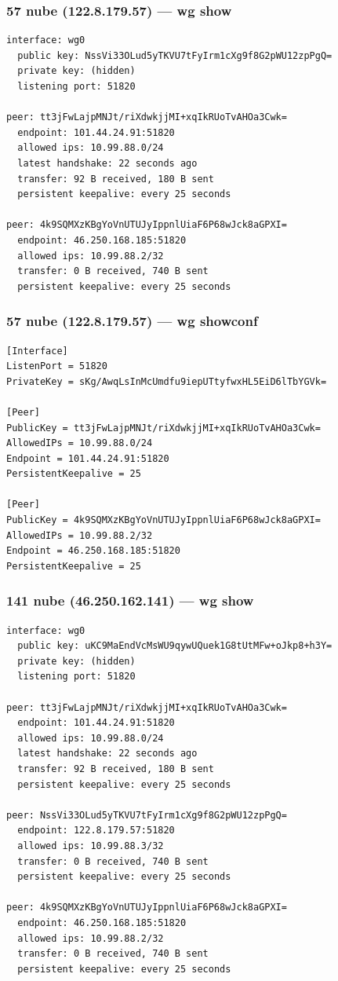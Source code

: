 \documentclass[11pt,a4paper]{article}
\begin{document}
\subsubsection*{57 nube (122.8.179.57) — wg show}
\begin{lstlisting}
interface: wg0
  public key: NssVi33OLud5yTKVU7tFyIrm1cXg9f8G2pWU12zpPgQ=
  private key: (hidden)
  listening port: 51820

peer: tt3jFwLajpMNJt/riXdwkjjMI+xqIkRUoTvAHOa3Cwk=
  endpoint: 101.44.24.91:51820
  allowed ips: 10.99.88.0/24
  latest handshake: 22 seconds ago
  transfer: 92 B received, 180 B sent
  persistent keepalive: every 25 seconds

peer: 4k9SQMXzKBgYoVnUTUJyIppnlUiaF6P68wJck8aGPXI=
  endpoint: 46.250.168.185:51820
  allowed ips: 10.99.88.2/32
  transfer: 0 B received, 740 B sent
  persistent keepalive: every 25 seconds

\end{lstlisting}

\subsubsection*{57 nube (122.8.179.57) — wg showconf}
\begin{lstlisting}
[Interface]
ListenPort = 51820
PrivateKey = sKg/AwqLsInMcUmdfu9iepUTtyfwxHL5EiD6lTbYGVk=

[Peer]
PublicKey = tt3jFwLajpMNJt/riXdwkjjMI+xqIkRUoTvAHOa3Cwk=
AllowedIPs = 10.99.88.0/24
Endpoint = 101.44.24.91:51820
PersistentKeepalive = 25

[Peer]
PublicKey = 4k9SQMXzKBgYoVnUTUJyIppnlUiaF6P68wJck8aGPXI=
AllowedIPs = 10.99.88.2/32
Endpoint = 46.250.168.185:51820
PersistentKeepalive = 25

\end{lstlisting}

\subsubsection*{141 nube (46.250.162.141) — wg show}
\begin{lstlisting}
interface: wg0
  public key: uKC9MaEndVcMsWU9qywUQuek1G8tUtMFw+oJkp8+h3Y=
  private key: (hidden)
  listening port: 51820

peer: tt3jFwLajpMNJt/riXdwkjjMI+xqIkRUoTvAHOa3Cwk=
  endpoint: 101.44.24.91:51820
  allowed ips: 10.99.88.0/24
  latest handshake: 22 seconds ago
  transfer: 92 B received, 180 B sent
  persistent keepalive: every 25 seconds

peer: NssVi33OLud5yTKVU7tFyIrm1cXg9f8G2pWU12zpPgQ=
  endpoint: 122.8.179.57:51820
  allowed ips: 10.99.88.3/32
  transfer: 0 B received, 740 B sent
  persistent keepalive: every 25 seconds

peer: 4k9SQMXzKBgYoVnUTUJyIppnlUiaF6P68wJck8aGPXI=
  endpoint: 46.250.168.185:51820
  allowed ips: 10.99.88.2/32
  transfer: 0 B received, 740 B sent
  persistent keepalive: every 25 seconds

\end{lstlisting}
\end{document}
